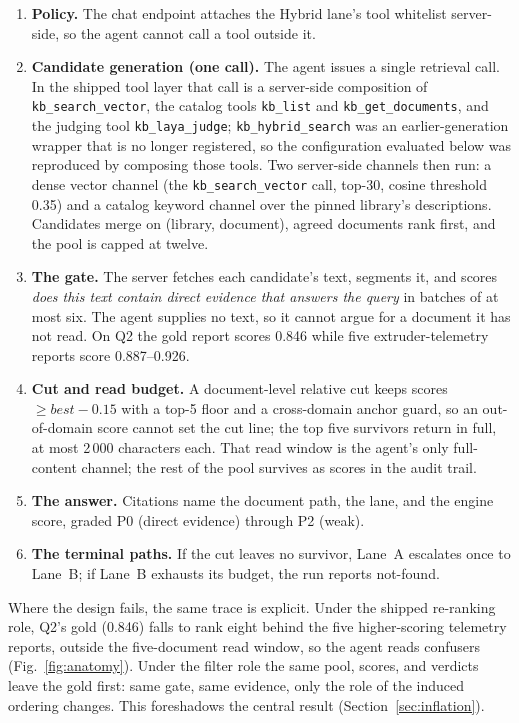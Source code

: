 \begin{enumerate}
\item \textbf{Policy.} The chat endpoint attaches the Hybrid lane's tool
whitelist server-side, so the agent cannot call a tool outside it.
\item \textbf{Candidate generation (one call).} The agent issues a single
retrieval call. In the shipped tool layer that call is a server-side
composition of \texttt{kb\_search\_vector}, the catalog tools \texttt{kb\_list}
and \texttt{kb\_get\_documents}, and the judging tool \texttt{kb\_laya\_judge};
\texttt{kb\_hybrid\_search} was an earlier-generation wrapper that is no longer
registered, so the configuration evaluated below was reproduced by composing
those tools. Two server-side channels then run: a dense vector channel
(the \texttt{kb\_search\_vector} call, top-30, cosine threshold 0.35) and a
catalog keyword channel over the pinned library's descriptions. Candidates
merge on (library, document), agreed documents rank first, and the pool is
capped at twelve.
\item \textbf{The gate.} The server fetches each candidate's text, segments it,
and scores \emph{does this text contain direct evidence that answers the query}
in batches of at most six. The agent supplies no text, so it cannot
argue for a document it has not read. On Q2 the gold report scores 0.846 while
five extruder-telemetry reports score 0.887--0.926.
\item \textbf{Cut and read budget.} A document-level relative cut keeps scores
$\geq \mathit{best}-0.15$ with a top-5 floor and a cross-domain anchor guard, so
an out-of-domain score cannot set the cut line; the top five survivors return in
full, at most 2\,000 characters each. That read window is the agent's only
full-content channel; the rest of the pool survives as scores in the audit
trail.
\item \textbf{The answer.} Citations name the document path, the lane, and the
engine score, graded P0 (direct evidence) through P2 (weak).
\item \textbf{The terminal paths.} If the cut leaves no survivor, Lane~A
escalates once to Lane~B; if Lane~B exhausts its budget, the run reports
not-found.
\end{enumerate}

Where the design fails, the same trace is explicit. Under the shipped re-ranking
role, Q2's gold (0.846) falls to rank eight behind the five higher-scoring
telemetry reports, outside the five-document read window, so the agent reads
confusers (Fig.~\ref{fig:anatomy}). Under the filter role the same pool, scores,
and verdicts leave the gold first: same gate, same evidence, only the role of the
induced ordering changes. This foreshadows the central result
(Section~\ref{sec:inflation}).

